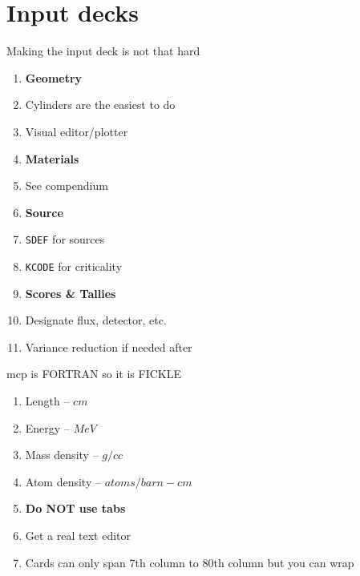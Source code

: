 \documentclass[aspectratio=1610,pdftex,dvipsnames,compress,xcolor={dvipsnames}]{beamer}
\newcommand{\acs}{\acrshort} %
\begin{document}
\section{Input decks}


\addtocounter{framenumber}{-1} 
\begin{frame}{Making the input deck is not that hard}
    \begin{enumerate}[series=outerlist,topsep=0pt,itemsep=0pt,leftmargin=*,label=(\arabic*)]
        \item[]\textbf{Geometry}
        \item[]Cylinders are the easiest to do
        \item[]Visual editor/plotter
            \vspace{0.15in}
        \item[]\textbf{Materials}
        \item[]See compendium
            \vspace{0.15in}
        \item[]\textbf{Source}
        \item[]\texttt{SDEF} for sources
        \item[]\texttt{KCODE} for criticality
            \vspace{0.15in}
        \item[]\textbf{Scores \& Tallies}
        \item[]Designate flux, detector, etc.
            \vspace{0.15in}
        \item[]Variance reduction if needed after
    \end{enumerate}
\end{frame}


\begin{frame}{\acs{mcp} is FORTRAN so it is FICKLE}
    \begin{enumerate}[series=outerlist,topsep=0pt,itemsep=21pt,leftmargin=*,label=(\arabic*)]
        \item[]Length -- $cm$
        \item[]Energy -- $MeV$
        \item[]Mass density -- $g/cc$
        \item[]Atom density -- $atoms/barn-cm$
        \item[]\textbf{Do NOT use tabs}
        \item[]Get a real text editor
        \item[]Cards can only span 7th column to 80th column but you can wrap
    \end{enumerate}
\end{frame}
\end{document}
